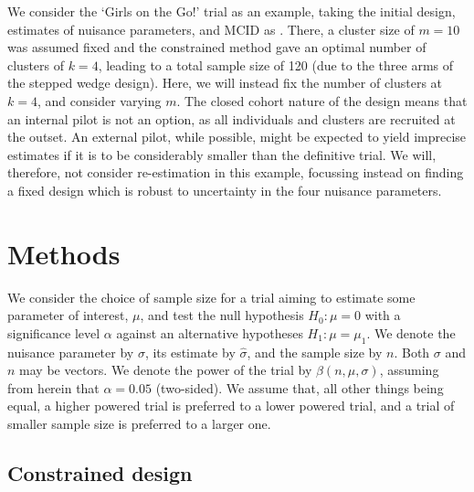 \documentclass[sagev, Crown]{sagej}
\begin{document}
We consider the `Girls on the Go!' trial as an example, taking the initial design, estimates of nuisance parameters, and MCID as \cite{Hooper2016}. There, a cluster size of $m = 10$ was assumed fixed and the constrained method gave an optimal number of clusters of $k = 4$, leading to a total sample size of 120 (due to the three arms of the stepped wedge design). Here, we will instead fix the number of clusters at $k = 4$, and consider varying $m$. The closed cohort nature of the design means that an internal pilot is not an option, as all individuals and clusters are recruited at the outset. An external pilot, while possible, might be expected to yield imprecise estimates if it is to be considerably smaller than the definitive trial. We will, therefore, not consider re-estimation in this example, focussing instead on finding a fixed design which is robust to uncertainty in the four nuisance parameters.

\section{Methods}\label{sec:methods}

We consider the choice of sample size for a trial aiming to estimate some parameter of interest, $\mu$, and test the null hypothesis $H_0: \mu = 0$ with a significance level $\alpha$ against an alternative hypotheses $H_1: \mu = \mu_1$. We denote the nuisance parameter by $\sigma$, its estimate by $\hat{\sigma}$, and the sample size by $n$. Both $\sigma$ and $n$ may be vectors. We denote the power of the trial by $\beta(n, \mu, \sigma)$, assuming from herein that $\alpha = 0.05$ (two-sided). We assume that, all other things being equal, a higher powered trial is preferred to a lower powered trial, and a trial of smaller sample size is preferred to a larger one. 

\subsection{Constrained design}

\end{document}

